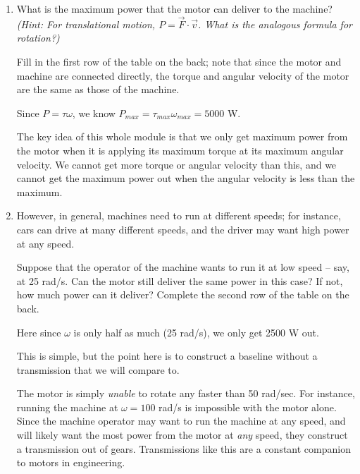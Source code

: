 \documentclass[12pt]{article}
\begin{document}
\begin{enumerate}

\item What is the maximum power that the motor can deliver to the machine? \textit{(Hint: For translational motion, $P = \vec F \cdot \vec v$. What is the analogous formula for rotation?)} 

Fill in the first row of the table on the back; note that since the motor and machine are connected directly, the torque and angular velocity of the motor are the same as those of the machine.
	
	
{	\color{red} Since $P = \tau \omega$, we know $P_{max} = \tau_{max} \omega_{max} = 5000$ W.

\color{blue}	
	The key idea of this whole module is that we only get maximum power from the motor when it is applying its maximum torque at its maximum angular velocity. We cannot get more torque or angular velocity than this, and we cannot get the maximum power out when the angular velocity is less than the maximum.}
	
\item However, in general, machines need to run at different speeds; for instance, cars can drive at many different speeds, and 
	the driver may want high power at any speed.

		Suppose that the operator of the machine wants to run it at low speed -- say, at 25 rad/s. Can the motor still deliver the same power in this case? If not, how much power can it deliver? Complete the second row of the table on the back.
		
		{\color{red} Here since $\omega$ is only half as much (25 rad/s), we only get 2500 W out. 
			
			\color{blue}
			
			This is simple, but the point here is to construct a baseline without a transmission that we will compare to.}
	
\newpage



The motor is simply {\it unable} to rotate any faster than 50 rad/sec. For instance, running the machine at $\omega = 100$ rad/s is impossible with the motor alone. Since the machine operator may want to run the machine at any speed, and will likely want the most power from the motor at {\it any} speed, they construct a transmission out of gears. Transmissions like this are a constant companion to motors in engineering.
\medskip

\begin{minipage}{0.4\textwidth}
	

\end{minipage}
\end{enumerate}
\end{document}
